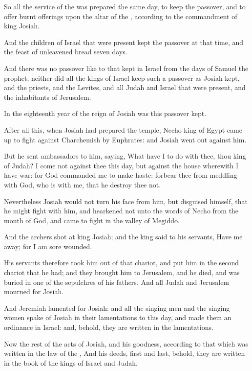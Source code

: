 \Verse So all the service of the \LORD was prepared the same day, to keep the passover, and to offer burnt offerings upon the altar of the \LORD, according to the commandment of king Josiah.

\Verse And the children of Israel that were present kept the passover at that time, and the feast of unleavened bread seven days.

\Verse And there was no passover like to that kept in Israel from the days of Samuel the prophet; neither did all the kings of Israel keep such a passover as Josiah kept, and the priests, and the Levites, and all Judah and Israel that were present, and the inhabitants of Jerusalem.

\Verse In the eighteenth year of the reign of Josiah was this passover kept.

\Verse After all this, when Josiah had prepared the temple, Necho king of Egypt came up to fight against Charchemish by Euphrates: and Josiah went out against him.

\Verse But he sent ambassadors to him, saying, What have I to do with thee, thou king of Judah? I come not against thee this day, but against the house wherewith I have war: for God commanded me to make haste: forbear thee from meddling with God, who is with me, that he destroy thee not.

\Verse Nevertheless Josiah would not turn his face from him, but disguised himself, that he might fight with him, and hearkened not unto the words of Necho from the mouth of God, and came to fight in the valley of Megiddo.

\Verse And the archers shot at king Josiah; and the king said to his servants, Have me away; for I am sore wounded.

\Verse His servants therefore took him out of that chariot, and put him in the second chariot that he had; and they brought him to Jerusalem, and he died, and was buried in one of the sepulchres of his fathers.  And all Judah and Jerusalem mourned for Josiah.

\Verse And Jeremiah lamented for Josiah: and all the singing men and the singing women spake of Josiah in their lamentations to this day, and made them an ordinance in Israel: and, behold, they are written in the lamentations.

\Verse Now the rest of the acts of Josiah, and his goodness, according to that which was written in the law of the \LORD, \Verse And his deeds, first and last, behold, they are written in the book of the kings of Israel and Judah.


